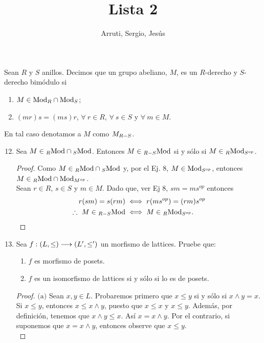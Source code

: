 \documentclass{article}
\title{Lista 2}
\author{Arruti, Sergio, Jesús}
\date{}
\begin{document}
	\maketitle
	\begin{define}
		Sean $R$ y $S$ anillos. Decimos que un grupo abeliano, $M$, es un $R$-derecho y $S$-derecho bimódulo si
		\begin{enumerate}[label=\roman*)]
			\item $M\in\ringmod{R}{\text{Mod}}{r}\cap\ringmod{S}{\text{Mod}}{r}$;
			\item $(mr)s=(ms)r$, $\forall\ r\in R$, $\forall\ s\in S$ y $\forall\ m\in M$.
		\end{enumerate}
		En tal caso denotamos a $M$ como $\ringbimod{R}{S}{M}{r}$.
	\end{define}
	\begin{enumerate}[label=\textbf{Ej \arabic*.}]
		\setcounter{enumi}{11}
		
		\item Sea $M\in\ringmod{R}{\text{Mod}}{l}\cap\ringmod{S}{\text{Mod}}{l}$. Entonces $M\in\ringbimod{R}{S}{\text{Mod}}{l}$ si y sólo si $M\in\ringbimod{R}{\opst{S}}{\text{Mod}}{lr}$.
		\begin{proof}
			Como $M\in\ringmod{R}{\text{Mod}}{l}\cap\ringmod{S}{\text{Mod}}{l}$ y, por el Ej. 8, $M\in\ringmod{\opst{S}}{\text{Mod}}{r}$, entonces $M\in\ringmod{R}{\text{Mod}}{l}\cap\ringmod{\opst{M}}{\text{Mod}}{r}$.\\ Sean $r\in R$, $s\in S$ y $m\in M$. 
			Dado que, ver Ej 8, $sm=ms^{op}$ entonces 
			\begin{align*}
				r(sm)=s(rm)&\iff r(m\opst{s})=(rm)\opst{s}\\
				\therefore\  M\in\ringbimod{R}{S}{\text{Mod}}{l}&\iff M\in\ringbimod{R}{\opst{S}}{\text{Mod}}{lr}.
			\end{align*}
		\end{proof}
		
		\item Sea $f:\left(L, \leq \right) \longrightarrow \left(L', \leq '\right)$ un morfismo de lattices. Pruebe que:
		\begin{enumerate}
			\item $f$ es morfismo de posets.
			\item $f$ es un isomorfismo de lattices si y sólo si lo es de posets.
		\end{enumerate}
		\begin{proof}
			$\boxed{\text{(a)}}$ Sean $x,y \in L$. Probaremos primero que $x \leq y$ si y sólo si $x \wedge y = x$. Si $x \leq y$, entonces $x \leq x \wedge y$, puesto que $x \leq x$ y $x \leq y$. Además, por definición, tenemos que $x \wedge y \leq x$. Así $x = x \wedge y$. Por el contrario, si suponemos que $x = x \wedge y$, entonces observe que $x \leq y$.\\
			

\end{proof}
\end{enumerate}
\end{document}
